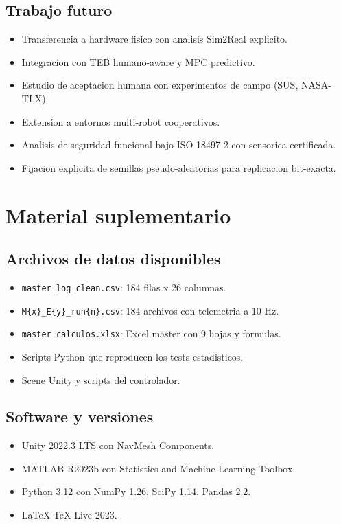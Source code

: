 \documentclass[12pt,a4paper,oneside]{book}
\begin{document}
\section{Trabajo futuro}

\begin{itemize}[leftmargin=*]
    \item Transferencia a hardware fisico con analisis Sim2Real explicito.
    \item Integracion con TEB humano-aware y MPC predictivo.
    \item Estudio de aceptacion humana con experimentos de campo (SUS, NASA-TLX).
    \item Extension a entornos multi-robot cooperativos.
    \item Analisis de seguridad funcional bajo ISO 18497-2 con sensorica certificada.
    \item Fijacion explicita de semillas pseudo-aleatorias para replicacion bit-exacta.
\end{itemize}

\appendix

\chapter{Material suplementario}

\section{Archivos de datos disponibles}

\begin{itemize}[leftmargin=*]
    \item \texttt{master\_log\_clean.csv}: 184 filas x 26 columnas.
    \item \texttt{M\{x\}\_E\{y\}\_run\{n\}.csv}: 184 archivos con telemetria a 10 Hz.
    \item \texttt{master\_calculos.xlsx}: Excel master con 9 hojas y formulas.
    \item Scripts Python que reproducen los tests estadisticos.
    \item Scene Unity y scripts del controlador.
\end{itemize}

\section{Software y versiones}

\begin{itemize}
    \item Unity 2022.3 LTS con NavMesh Components.
    \item MATLAB R2023b con Statistics and Machine Learning Toolbox.
    \item Python 3.12 con NumPy 1.26, SciPy 1.14, Pandas 2.2.
    \item LaTeX TeX Live 2023.
\end{itemize}
\end{document}
